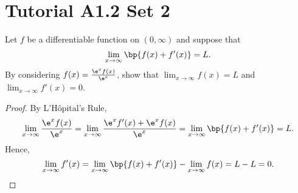 \section{Tutorial A1.2 Set 2}

\begin{problem}
    Let $f$ be a differentiable function on $(0, \infty)$ and suppose that \[\lim_{x \to \infty} \bp{f(x) + f'(x)} = L.\] By considering $f(x) = \frac{\e^x f(x)}{\e^x}$, show that $\lim_{x \to \infty} f(x) = L$ and $\lim_{x \to \infty} f'(x) = 0$.
\end{problem}
\begin{proof}
    By L'H\^{o}pital's Rule, \[\lim_{x \to \infty} \frac{\e^x f(x)}{\e^x} = \lim_{x \to \infty} \frac{\e^x f'(x) + \e^x f(x)}{\e^x} = \lim_{x \to \infty} \bp{f(x) + f'(x)} = L.\] Hence, \[\lim_{x \to \infty} f'(x) = \lim_{x \to \infty} \bp{f(x) + f'(x)} - \lim_{x \to \infty} f(x) = L - L = 0.\]
\end{proof}


